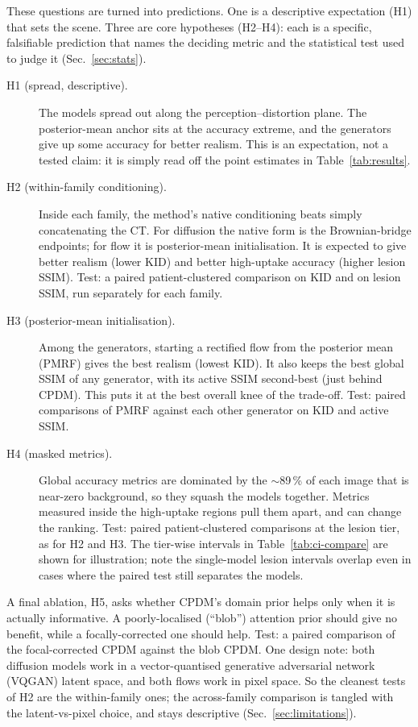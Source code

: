 \documentclass[11pt,a4paper]{article}
\newcommand{\num}[1]{#1}
\begin{document}
\noindent These questions are turned into predictions. One is a descriptive expectation (H1) that
sets the scene. Three are core hypotheses (H2--H4): each is a specific, falsifiable prediction
that names the deciding metric and the statistical test used to judge it
(Sec.~\ref{sec:stats}).
\begin{description}
  \item[H1 (spread, descriptive).] The models spread out along the perception--distortion plane.
  The posterior-mean anchor sits at the accuracy extreme, and the generators give up some
  accuracy for better realism. This is an expectation, not a tested claim: it is simply read off
  the point estimates in Table~\ref{tab:results}.
  \item[H2 (within-family conditioning).] Inside each family, the method's native
  conditioning beats simply concatenating the CT. For diffusion the native form is the
  Brownian-bridge endpoints; for flow it is posterior-mean initialisation. It is expected to give
  better realism (lower KID) and better high-uptake accuracy (higher lesion SSIM). Test: a
  paired patient-clustered comparison on KID and on lesion SSIM, run separately for each family.
  \item[H3 (posterior-mean initialisation).] Among the generators, starting a rectified flow from
  the posterior mean (PMRF) gives the best realism (lowest KID). It also keeps the
  best global SSIM of any generator, with its active SSIM second-best (just behind CPDM).
  This puts it at the best overall knee of the trade-off. Test: paired comparisons of PMRF
  against each other generator on KID and active SSIM.
  \item[H4 (masked metrics).] Global accuracy metrics are dominated by the $\sim$\num{89}\,\% of
  each image that is near-zero background, so they squash the models together. Metrics measured
  inside the high-uptake regions pull them apart, and can change the ranking. Test: paired
  patient-clustered comparisons at the lesion tier, as for H2 and H3. The tier-wise intervals in
  Table~\ref{tab:ci-compare} are shown for illustration; note the single-model lesion intervals
  overlap even in cases where the paired test still separates the models.
\end{description}
\noindent A final ablation, H5, asks whether CPDM's domain prior helps only when it is
actually informative. A poorly-localised (``blob'') attention prior should give no
benefit, while a focally-corrected one should help. Test: a paired comparison of the
focal-corrected CPDM against the blob CPDM. One design note: both diffusion models work in a
vector-quantised generative adversarial network (VQGAN) latent space, and both flows work in
pixel space. So the cleanest tests of H2 are the
within-family ones; the across-family comparison is tangled with the latent-vs-pixel
choice, and stays descriptive (Sec.~\ref{sec:limitations}).
\end{document}
